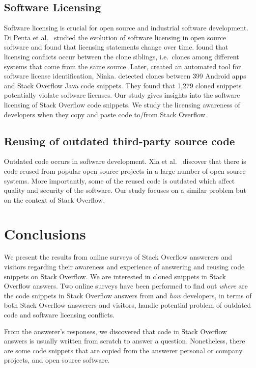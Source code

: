 \documentclass{svjour3}                     %
\begin{document}
\subsection{Software Licensing} Software licensing is crucial for open source
and industrial software development. Di Penta et al.~\cite{DiPenta2010} studied
the evolution of software licensing in open source software and found that
licensing statements change over time. \cite{German2009} found that licensing
conflicts occur between the clone siblings, i.e.~clones among different systems
that come from the same source. Later, \cite{German2010} created an automated
tool for software license identification, Ninka. \cite{An2017} detected clones
between 399 Android apps and Stack Overflow Java code snippets. They found  that
1,279 cloned snippets potentially violate software licenses. Our study gives
insights into the software licensing of Stack Overflow code snippets. We study
the licensing awareness of developers when they copy and paste code to/from
Stack Overflow.

\subsection{Reusing of outdated third-party source code} Outdated code occurs in
software development. Xia et al.~\cite{Xia2014} discover that there is code
reused from popular open source projects in a large number of open source
systems. More importantly, some of the reused code is outdated which affect
quality and security of the software. Our study focuses on a similar problem but
on the context of Stack Overflow.

\section{Conclusions}

We present the results from online surveys of Stack Overflow answerers and
visitors regarding their awareness and experience of answering and reusing code
snippets on Stack Overflow. We are interested in cloned snippets in Stack Overflow
answers. Two online surveys have been performed to find out \textit{where} are
the code snippets in Stack Overflow answers from and \textit{how} developers, in
terms of both Stack Overflow answerers and visitors, handle potential problem of
outdated code and software licensing conflicts.

From the answerer's responses, we discovered that code in Stack Overflow answers
is usually written from scratch to answer a question. Nonetheless, there are
some code snippets that are copied from the answerer personal or company projects,
and open source software.
\end{document}
